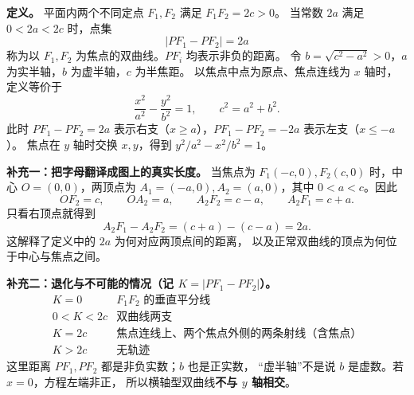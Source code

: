 \begin{statementbox}
\textbf{定义。} 平面内两个不同定点 $F_1,F_2$ 满足 $F_1F_2=2c>0$。
当常数 $2a$ 满足 $0<2a<2c$ 时，点集
\[
\boxed{|PF_1-PF_2|=2a}
\]
称为以 $F_1,F_2$ 为焦点的双曲线。$PF_i$ 均表示非负的距离。
令 $b=\sqrt{c^2-a^2}>0$，$a$ 为实半轴，$b$ 为虚半轴，$c$ 为半焦距。
以焦点中点为原点、焦点连线为 $x$ 轴时，定义等价于
\[
\boxed{\frac{x^2}{a^2}-\frac{y^2}{b^2}=1},\qquad c^2=a^2+b^2.
\]
此时 $PF_1-PF_2=2a$ 表示右支（$x\ge a$），$PF_1-PF_2=-2a$ 表示左支（$x\le-a$）。
焦点在 $y$ 轴时交换 $x,y$，得到 $y^2/a^2-x^2/b^2=1$。
\end{statementbox}

\begin{statementbox}
\textbf{补充一：把字母翻译成图上的真实长度。}
当焦点为 $F_1(-c,0),F_2(c,0)$ 时，中心 $O=(0,0)$，两顶点为
$A_1=(-a,0),A_2=(a,0)$，其中 $0<a<c$。因此
\[
OF_2=c,\qquad OA_2=a,\qquad A_2F_2=c-a,\qquad A_2F_1=c+a.
\]
只看右顶点就得到
\[
A_2F_1-A_2F_2=(c+a)-(c-a)=2a.
\]
这解释了定义中的 $2a$ 为何对应两顶点间的距离，
以及正常双曲线的顶点为何位于中心与焦点之间。

\textbf{补充二：退化与不可能的情况（记 $K=|PF_1-PF_2|$）。}
\[
\begin{array}{c|c}
K=0 & F_1F_2\text{ 的垂直平分线}\\
0<K<2c & \text{双曲线两支}\\
K=2c & \text{焦点连线上、两个焦点外侧的两条射线（含焦点）}\\
K>2c & \text{无轨迹}
\end{array}
\]
这里距离 $PF_1,PF_2$ 都是非负实数；$b$ 也是正实数，
“虚半轴”不是说 $b$ 是虚数。若 $x=0$，方程左端非正，
所以横轴型双曲线\textbf{不与 $y$ 轴相交}。
\end{statementbox}

